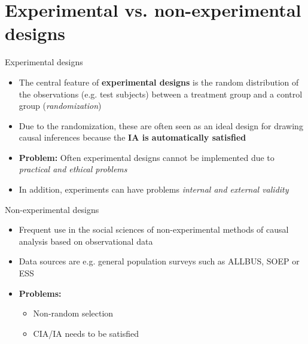 \documentclass{beamer}\usepackage[]{graphicx}\usepackage[]{color}
\begin{document}

\section{Experimental vs. non-experimental designs} %

\begin{frame}{Experimental designs}
  \begin{itemize}
  \item The central feature of \textbf{experimental designs} is the random distribution of the observations (e.g. test subjects) between a treatment group and a control group (\textit{randomization})
  \item Due to the randomization, these are often seen as an ideal design for drawing causal inferences because the \textbf{IA is automatically satisfied}
  \item \textbf{Problem:} Often experimental designs cannot be implemented due to \textit{practical and ethical problems}
  \item In addition, experiments can have problems \textit{internal and external validity}
  \end{itemize}
\end{frame}


\begin{frame}{Non-experimental designs}
  \begin{itemize}
    \item Frequent use in the social sciences of non-experimental methods of causal analysis based on observational data
    \item Data sources are e.g. general population surveys such as ALLBUS, SOEP or ESS
    \item \textbf{Problems:}
      \begin{itemize}  
        \item Non-random selection
        \item CIA/IA needs to be satisfied
      \end{itemize}
  \end{itemize}
\end{frame}
\end{document}
